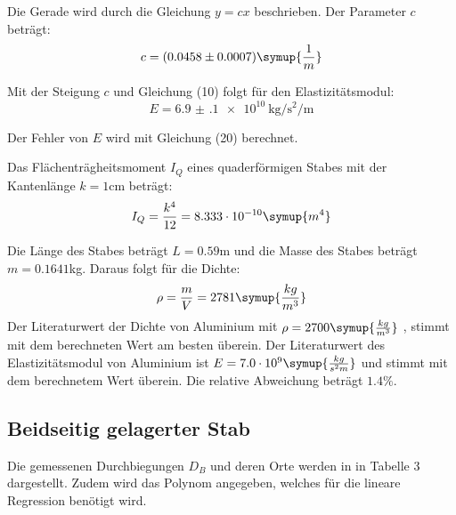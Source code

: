 Die Gerade wird durch die Gleichung $y = cx$ beschrieben. Der Parameter $c$ beträgt:
\begin{align*}
  c &= (0.0458 \pm 0.0007) \symup{\frac{1}{m}} \\
\end{align*}


Mit der Steigung $c$ und Gleichung (10) folgt für den Elastizitätsmodul:
\begin{equation}
  E = \SI{6.9(1)e10}{\kilo\gram\per\second\squared\per\meter}
\end{equation}

Der Fehler von $E$ wird mit Gleichung (20) berechnet.

Das Flächenträgheitsmoment $I_Q$ eines quaderförmigen Stabes mit der Kantenlänge
$k = 1$cm beträgt:
\begin{equation}
  I_Q = \frac{k^4}{12} = 8.333 \cdot 10^{-10} \symup{m^4}
\end{equation}


Die Länge des Stabes beträgt $L = 0.59$m und die Masse des Stabes beträgt $m = 0.1641$kg.
Daraus folgt für die Dichte:
\begin{equation}
  \rho = \frac{m}{V} = 2781 \symup{\frac{kg}{m^3}}
\end{equation}
Der Literaturwert der Dichte von Aluminium mit $\rho = 2700 \symup{\frac{kg}{m^3}}$ \cite{sample4},
stimmt mit dem berechneten Wert am besten überein. Der Literaturwert des Elastizitätsmodul
von Aluminium ist $E = 7.0 \cdot 10^{9} \symup{\frac{kg}{s^2m}}$ \cite{sample3} und stimmt mit dem berechnetem Wert
überein. Die relative Abweichung beträgt $1.4 \%$.

\subsection{Beidseitig gelagerter Stab}
Die gemessenen Durchbiegungen $D_{B}$ und deren Orte werden in in Tabelle 3 dargestellt. Zudem wird
das Polynom angegeben, welches für die lineare Regression benötigt wird.


